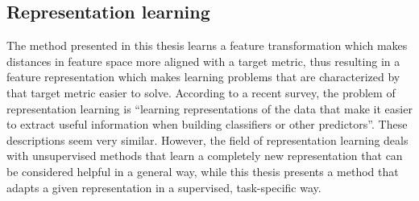 \subsection{Representation learning}

The method presented in this thesis learns a feature transformation which makes distances in feature space more aligned with a target metric, thus resulting in a feature representation which makes learning problems that are characterized by that target metric easier to solve. According to a recent survey, the problem of representation learning is ``learning representations of the data that make it easier to extract useful information when building classiﬁers or other predictors''. \cite{bengio2013representation} These descriptions seem very similar. However, the field of representation learning deals with unsupervised methods that learn a completely new representation that can be considered helpful in a general way, while this thesis presents a method that adapts a given representation in a supervised, task-specific way.









